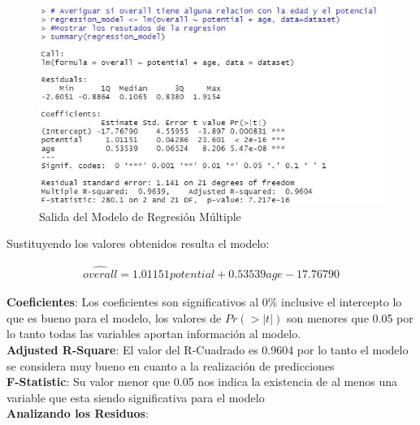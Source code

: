 \documentclass[a4paper,10pt,twocolumn]{article}
\begin{document}
\begin{figure}[h]
	\includegraphics[scale=0.65]{./imgs/reg_model.jpg}
	\caption{Salida del Modelo de Regresión Múltiple}
\end{figure}

Sustituyendo los valores obtenidos resulta el modelo:

\begin{align*}
\widehat{overall} = 1.01151 potential + 0.53539 age - 17.76790
\end{align*}

\textbf{Coeficientes}: Los coeficientes son significativos al $0\%$ inclusive el intercepto lo que es bueno para el modelo, los valores de $Pr(>|t|)$ son menores que 0.05 por lo tanto todas las variables aportan información al modelo.\\

\textbf{Adjusted R-Square}: El valor del R-Cuadrado es 0.9604 por lo tanto el modelo se considera muy bueno en cuanto a la realizaci\'on de predicciones\\

\textbf{F-Statistic}: Su valor menor que 0.05 nos indica la existencia de al menos una variable que esta siendo significativa para el modelo\\



\textbf{Analizando los Residuos}:
\end{document}

